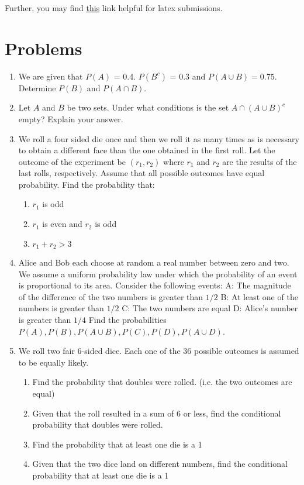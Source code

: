 \documentclass[12pt, oneside]{article}
\begin{document}
Further, you may find \href{https://www.authorea.com/users/77723/articles/110898-how-to-write-mathematical-equations-expressions-and-symbols-with-latex-a-cheatsheet}{this} link helpful for latex submissions.


\section{Problems}
\begin{enumerate}

\item We are given that $P(A)$ = 0.4. $P(B^c)$ = 0.3 and ${P(A \cup B)} = 0.75$. Determine $P(B)$ and $P(A \cap B)$.

\newpage
\item Let $A$ and $B$ be two sets. Under what conditions is the set $A \cap (A \cup B)^c$ empty? Explain your answer.

\newpage
\item We roll a four sided die once and then we roll it as many times as is necessary to obtain a different face than the one obtained in the first roll. Let the outcome of the experiment be $(r_{1},r_{2})$ where $r_{1}$ and $r_{2}$ are the results of the last rolls, respectively. Assume that all possible outcomes have equal probability. Find the probability that:
\begin{enumerate}
    \item $r_{1}$ is odd
    \item $r_{1}$ is even and $r_{2}$ is odd
    \item $r_{1} + r_{2} > 3$
\end{enumerate}

\newpage
\item Alice and Bob each choose at random a real number between zero and two. We assume a uniform probability law under which the probability of an event is proportional to its area. Consider the following events:
\SubItem A: The magnitude of the difference of the two numbers is greater than $1/2$
\SubItem B: At least one of the numbers is greater than $1/2$
\SubItem C: The two numbers are equal
\SubItem D: Alice's number is greater than $1/4$
\smallbreak
Find the probabilities $P(A), P(B), P(A \cup B), P(C), P(D), P(A \cup D)$.

\newpage
\item We roll two fair 6-sided dice. Each one of the 36 possible outcomes is assumed to be equally likely.
\begin{enumerate}
    \item Find the probability that doubles were rolled. (i.e. the two outcomes are equal)
    \item Given that the roll resulted in a sum of 6 or less, find the conditional probability that doubles were rolled.
    \item Find the probability that at least one die is a 1
    \item Given that the two dice land on different numbers, find the conditional probability that at least one die is a 1
\end{enumerate}


\end{enumerate}
\end{document}
